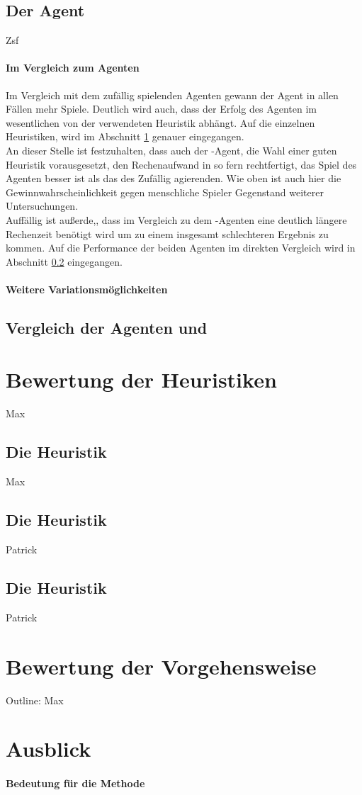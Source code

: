 \subsection{Der Agent }
Zsf 
\paragraph{Im Vergleich zum Agenten }
Im Vergleich mit dem zufällig spielenden Agenten gewann der Agent  in allen  Fällen mehr Spiele. Deutlich wird auch, dass der Erfolg des Agenten im wesentlichen von der verwendeten Heuristik abhängt. Auf die einzelnen Heuristiken, wird im Abschnitt \ref{sect:Fazit:Heuristiken} genauer eingegangen.
\\An dieser Stelle ist festzuhalten, dass auch der -Agent, die Wahl einer guten Heuristik vorausgesetzt, den Rechenaufwand in so fern rechtfertigt, das Spiel des Agenten besser ist als das des Zufällig agierenden. Wie oben ist auch hier die Gewinnwahrscheinlichkeit gegen menschliche Spieler Gegenstand weiterer Untersuchungen.
\\Auffällig ist außerde,, dass im Vergleich zu dem -Agenten eine deutlich längere Rechenzeit benötigt wird um zu einem insgesamt schlechteren Ergebnis zu kommen. Auf die Performance der beiden Agenten im direkten Vergleich wird in Abschnitt \ref{subsec:Fazit:AgentenVgl} eingegangen.
\paragraph{Weitere Variationsmöglichkeiten}

\subsection{Vergleich der Agenten  und }
\label{subsec:Fazit:AgentenVgl}

\section{Bewertung der Heuristiken}
\label{sect:Fazit:Heuristiken}
Max
\subsection{Die Heuristik }
Max
\subsection{Die Heuristik }
Patrick
\subsection{Die Heuristik }
Patrick

\section{Bewertung der Vorgehensweise}
Outline: Max

\section{Ausblick}
\paragraph{Bedeutung für die Methode}

